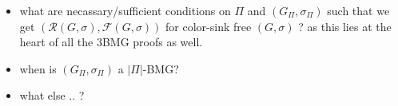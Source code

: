\documentclass[final,3p,times]{elsarticle}
\newcommand{\TODO}[1]{\begingroup\color{red}#1\endgroup}
\begin{document}
\TODO{\smallskip
\begin{itemize}
\item what are necassary/sufficient conditions on $\Pi$ and $(G_{\Pi},\sigma_{\Pi})$
such that we get $(\mathscr{R}(G,\sigma),\mathscr{F}(G,\sigma))$ for color-sink free $(G,\sigma)$
? as this lies at the heart of all the 3BMG proofs as well. 

\item when is  $(G_{\Pi},\sigma_{\Pi})$ a $|\Pi|$-BMG?

\item what else .. ?

\end{itemize}
}



















\end{document}
